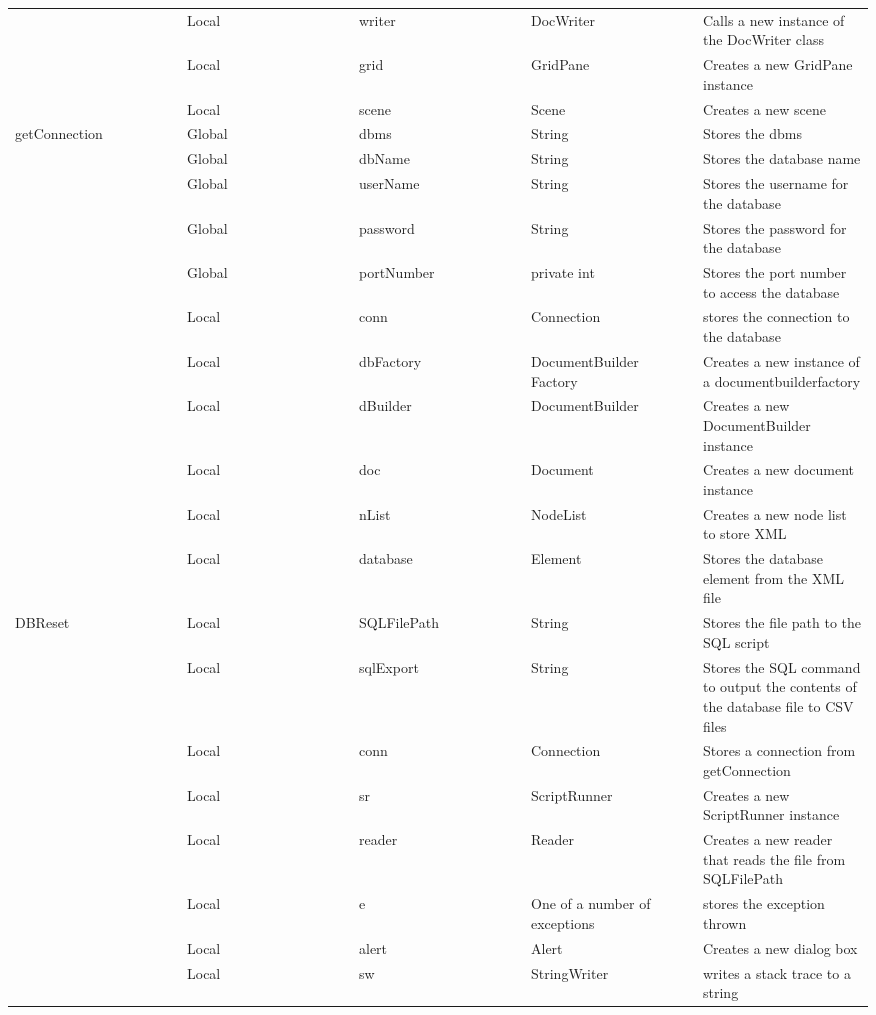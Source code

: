 \documentclass[11pt]{report}
\begin{document}
\begin{longtable}{|p{0.2\linewidth}|p{0.2\linewidth}|p{0.2\linewidth}|p{0.2\linewidth}|p{0.2\linewidth}|}
			 & Local & writer & DocWriter & Calls a new instance of the DocWriter class \\
			 & Local & grid & GridPane & Creates a new GridPane instance\\
			 & Local & scene & Scene & Creates a new scene \\
			 \hline
			getConnection & Global & dbms & String & Stores the dbms\\
			 & Global & dbName & String & Stores the database name \\
			 & Global & userName & String & Stores the username for the database\\
			 & Global & password & String & Stores the password for the database\\
			 & Global & portNumber & private int & Stores the port number to access the database \\
			 & Local & conn & Connection & stores the connection to the database \\
			 & Local & dbFactory & DocumentBuilder Factory & Creates a new instance of a documentbuilderfactory \\
			 & Local & dBuilder & DocumentBuilder & Creates a new DocumentBuilder instance \\
			 & Local & doc & Document & Creates a new document instance \\
			 & Local & nList & NodeList & Creates a new node list to store XML \\
			 & Local & database & Element & Stores the database element from the XML file\\
			\hline
			DBReset & Local & SQLFilePath & String & Stores the file path to the SQL script \\
			 & Local & sqlExport & String & Stores the SQL command to output the contents of the database file to CSV files \\
			 & Local & conn & Connection & Stores a connection from getConnection\\
			 & Local & sr & ScriptRunner & Creates a new ScriptRunner instance \\
			 & Local & reader & Reader & Creates a new reader that reads the file from SQLFilePath \\
			 & Local & e & One of a number of exceptions & stores the exception thrown \\
			 & Local & alert & Alert & Creates a new dialog box\\
			 & Local & sw & StringWriter & writes a stack trace to a string \\

\end{longtable}
\end{document}
